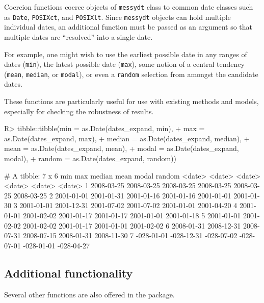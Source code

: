 \documentclass[
]{jss}
\begin{document}
Coercion functions coerce objects of \texttt{messydt} class to common
date classes such as \texttt{Date}, \texttt{POSIXct}, and
\texttt{POSIXlt}. Since \texttt{messydt} objects can hold multiple
individual dates, an additional function must be passed as an argument
so that multiple dates are ``resolved'' into a single date.

For example, one might wish to use the earliest possible date in any
ranges of dates (\texttt{min}), the latest possible date (\texttt{max}),
some notion of a central tendency (\texttt{mean}, \texttt{median}, or
\texttt{modal}), or even a \texttt{random} selection from amongst the
candidate dates.

These functions are particularly useful for use with existing methods
and models, especially for checking the robustness of results.

\begin{CodeChunk}
\begin{CodeInput}
R> tibble::tibble(min = as.Date(dates_expand, min),
+                max = as.Date(dates_expand, max),
+                median = as.Date(dates_expand, median),
+                mean = as.Date(dates_expand, mean),
+                modal = as.Date(dates_expand, modal),
+                random = as.Date(dates_expand, random))
\end{CodeInput}
\begin{CodeOutput}
# A tibble: 7 x 6
  min        max        median     mean       modal      random    
  <date>     <date>     <date>     <date>     <date>     <date>    
1 2008-03-25 2008-03-25 2008-03-25 2008-03-25 2008-03-25 2008-03-25
2 2001-01-01 2001-01-31 2001-01-16 2001-01-16 2001-01-01 2001-01-30
3 2001-01-01 2001-12-31 2001-07-02 2001-07-02 2001-01-01 2001-04-20
4 2001-01-01 2001-02-02 2001-01-17 2001-01-17 2001-01-01 2001-01-18
5 2001-01-01 2001-02-02 2001-02-02 2001-01-17 2001-01-01 2001-02-02
6 2008-01-31 2008-12-31 2008-07-31 2008-07-15 2008-01-31 2008-11-30
7 -028-01-01 -028-12-31 -028-07-02 -028-07-01 -028-01-01 -028-04-27
\end{CodeOutput}
\end{CodeChunk}

\hypertarget{additional-functionality}{%
\subsection{Additional functionality}\label{additional-functionality}}

Several other functions are also offered in the 
package.
\end{document}
